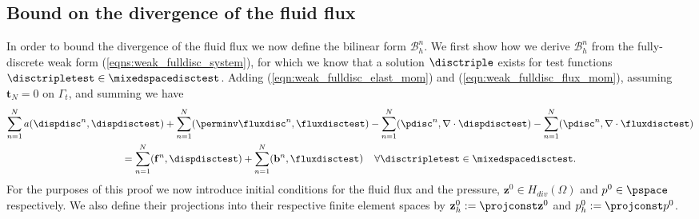 

\subsection{Bound on the divergence of the fluid flux}
\label{sec:linear_form_two}

In order to bound the divergence of the fluid flux we now define the bilinear form $\mathcal{B}_{h}^{n}$. We first show how we derive $\mathcal{B}_{h}^{n}$ from the fully-discrete weak form (\ref{eqns:weak_fulldisc_system}), for which we know that a solution $\disctriple$ exists for test functions $\disctripletest \in \mixedspacedisctest$.
Adding (\ref{eqn:weak_fulldisc_elast_mom}) and (\ref{eqn:weak_fulldisc_flux_mom}), assuming
$\mathbf{t}_{N}=0$ on $\Gamma_{t}$, and summing we have
\begin{multline}
 \sum_{n=1}^{N}    a(\dispdisc^{n},\dispdisctest)+ \sum_{n=1}^{N}   (\perminv \fluxdisc^{n}, \fluxdisctest)    - \sum_{n=1}^{N}   (\pdisc^{n}, \nabla \cdot \dispdisctest)    - \sum_{n=1}^{N}   (\pdisc^{n}, \nabla \cdot \fluxdisctest)    \\ =
\sum_{n=1}^{N}   (\mathbf{f}^{n},\dispdisctest)  + \sum_{n=1}^{N}   (\mathbf{b}^{n},\fluxdisctest) \;\;    \;\; \forall \disctripletest \in \mixedspacedisctest.
\label{eqn:Bstar1}
\end{multline}
For the purposes of this proof we now introduce initial conditions for the fluid flux and the pressure, $\mathbf{z}^{0}  \in  H_{div}(\Omega)$ and $p^0 \in \pspace$ respectively. We also define their projections into their respective finite element spaces by  $\mathbf{z}^{0}_h := \projconst \mathbf{z}^{0}$ and $p^0_h := \projconst p^0$.

